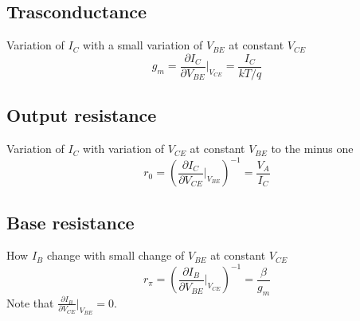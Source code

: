 \subsection{Trasconductance}
Variation of $I_C$ with a small variation of $V_{BE}$ at constant $V_{CE}$ 
\begin{equation}
g_m=\frac{\partial I_C}{\partial V_{BE}}|_{V_{CE}}=\frac{I_C}{kT/q}
\end{equation}

\subsection{Output resistance}
Variation of $I_C$ with variation of $V_{CE}$ at constant $V_{BE}$ to the minus one 
\begin{equation}
r_0=\left(\frac{\partial I_C}{\partial V_{CE}}|_{V_{BE}}\right)^{-1}=\frac{V_A}{I_C}
\end{equation}

\subsection{Base resistance}
How $I_B$ change with small change of $V_{BE}$ at constant $V_{CE}$
\begin{equation}
r_{\pi}=\left(\frac{\partial I_B}{\partial V_{BE}}|_{V_{CE}}\right)^{-1}=\frac{\beta}{g_m}
\end{equation}
Note that $\frac{\partial I_B}{\partial V_{CE}}|_{V_{BE}}=0$.\\

